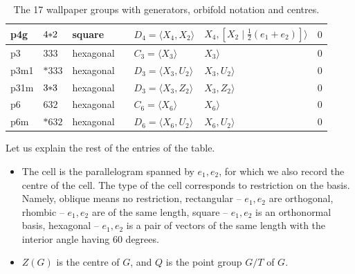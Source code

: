 \begin{table}[!htbp]
\begin{tabular}{lllllll}
p4g  & $4\hspace{-0.25em}*\hspace{-0.25em}2$     &  square      & & $D_4=\langle X_4,X_2\rangle$ &  $X_4,[X_2\mid\tfrac12 (e_1+e_2)]\rangle$ &  $0$   \\
\midrule
p3   & $333$     &  hexagonal   &  & $C_3=\langle X_3\rangle$ &  $X_3\rangle$ &  $0$  \\
p3m1 & $*333$    & hexagonal   & & $D_3=\langle X_3,U_2\rangle$ &  $X_3,U_2\rangle$ &   $0$  \\
p31m & $3\hspace{-0.25em}*\hspace{-0.25em}3$     & hexagonal   & & $D_3=\langle X_3,Z_2\rangle$ &  $X_3,Z_2 \rangle$ &   $0$   \\
p6   &  $632$     & hexagonal   &  & $C_6=\langle X_6\rangle$ &$X_6\rangle$ &  $0$  \\
p6m  & $*632$    & hexagonal   &  & $D_6=\langle X_6,U_2\rangle$ &  $X_6,U_2\rangle$ &  $0$   \\
\bottomrule
\end{tabular}
\caption{The 17 wallpaper groups with generators, orbifold notation and centres.}
\label{table:wallpaper1}
\end{table}

Let us explain the rest of the entries of the table.

\begin{itemize}
  \item  The cell is the parallelogram spanned by $e_1,e_2$, for which we also record the centre of the cell. The type of the cell corresponds to restriction on the basis.
Namely, oblique means no restriction,
rectangular  -- $e_1,e_2$ are orthogonal,
rhombic  -- $e_1,e_2$ are of the same length,
square --  $e_1,e_2$ is an orthonormal basis,
hexagonal -- $e_1,e_2$ is a pair of vectors of the same length
with the interior angle having 60 degrees. 
\item $Z(G)$ is the centre of $G$, and $Q$ is the point group $G / T$ of $G$.
\end{itemize}

